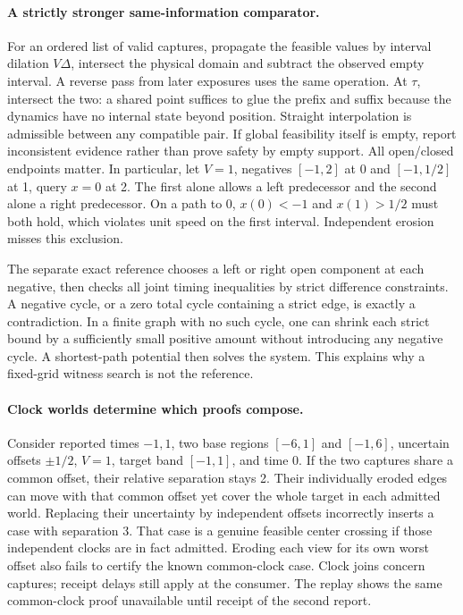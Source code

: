 \documentclass{article}
\begin{document}
\paragraph{A strictly stronger same-information comparator.}
For an ordered list of valid captures, propagate the feasible values
by interval dilation $V\Delta$, intersect the physical domain and
subtract the observed empty interval. A reverse pass from later
exposures uses the same operation. At $\tau$, intersect the two:
a shared point suffices to glue the prefix and suffix because the
dynamics have no internal state beyond position. Straight interpolation
is admissible between any compatible pair. If global feasibility itself
is empty, report inconsistent evidence rather than prove safety by
empty support. All open/closed endpoints matter.
In particular, let $V=1$, negatives $[-1,2]$ at 0 and $[-1,1/2]$
at 1, query $x=0$ at 2. The first alone allows a left predecessor
and the second alone a right predecessor. On a path to 0,
$x(0)<-1$ and $x(1)>1/2$ must both hold, which violates unit speed
on the first interval. Independent erosion misses this exclusion.

The separate exact reference chooses a left or right open component
at each negative, then checks all joint timing inequalities by
strict difference constraints. A negative cycle, or a zero total
cycle containing a strict edge, is exactly a contradiction. In a
finite graph with no such cycle, one can shrink each strict bound
by a sufficiently small positive amount without introducing any
negative cycle. A shortest-path potential then solves the system.
This explains why a fixed-grid witness search is not the reference.

\paragraph{Clock worlds determine which proofs compose.}
Consider reported times $-1,1$, two base regions $[-6,1]$ and
$[-1,6]$, uncertain offsets $\pm1/2$, $V=1$, target band $[-1,1]$, and time 0.
If the two captures share a common offset, their relative separation
stays 2. Their individually eroded edges can move with that common
offset yet cover the whole target in each admitted world. Replacing
their uncertainty by independent offsets incorrectly inserts a case
with separation 3. That case is a genuine feasible center crossing
if those independent clocks are in fact admitted. Eroding each view
for its own worst offset also fails to certify the known common-clock
case. Clock joins concern captures; receipt delays still apply at the
consumer. The replay shows the same common-clock proof unavailable
until receipt of the second report.
\end{document}
